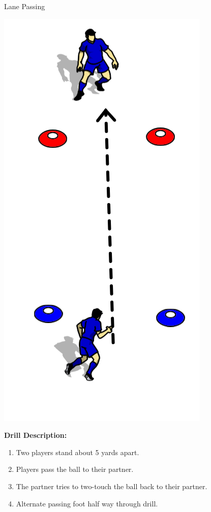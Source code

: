 \begin{oddBlock}{Lane Passing}

\begin{minipage}[t]{\linewidth}
    \centering
    
    \begin{minipage}{.3\linewidth} %
        \centering
        \includegraphics[width=.5\textwidth]{../img/Trimmed/Lane_Pass_BW}
    \end{minipage}
    \hspace{0.05\linewidth}
    \begin{minipage}{.6\linewidth} %
        \textbf{Drill Description:}

        \begin{enumerate}
        \setlength{\itemsep}{0pt}
        \setlength{\parskip}{0pt}
        \setlength{\parsep}{0pt}
        \item Two players stand about 5 yards apart.
        \item Players pass the ball to their partner.
        \item The partner tries to two-touch the ball back to their partner.
        \item Alternate passing foot half way through drill.
        \end{enumerate}


\end{minipage}
\end{minipage}
\end{oddBlock}
